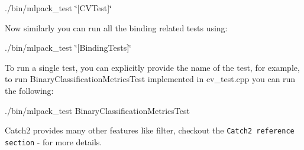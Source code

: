 {\ttfamily ./bin/mlpack\+\_\+test \char`\"{}[\+C\+V\+Test]\char`\"{}}

Now similarly you can run all the binding related tests using\+:

{\ttfamily ./bin/mlpack\+\_\+test \char`\"{}[\+Binding\+Tests]\char`\"{}}

To run a single test, you can explicitly provide the name of the test, for example, to run {\ttfamily Binary\+Classification\+Metrics\+Test} implemented in {\ttfamily cv\+\_\+test.\+cpp} you can run the following\+:

{\ttfamily ./bin/mlpack\+\_\+test Binary\+Classification\+Metrics\+Test}

Catch2 provides many other features like filter, checkout the {\tt Catch2 reference section} -\/ for more details. 